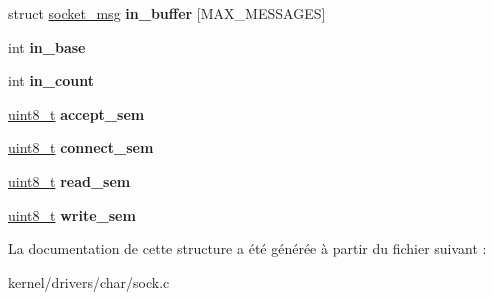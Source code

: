 \begin{DoxyCompactItemize}
\item 
\hypertarget{structsocket_a9ee09df65b7ec6bccd58fe2d4eebe6d9}{struct \hyperlink{structsocket__msg}{socket\-\_\-msg} {\bfseries in\-\_\-buffer} \mbox{[}M\-A\-X\-\_\-\-M\-E\-S\-S\-A\-G\-E\-S\mbox{]}}\label{structsocket_a9ee09df65b7ec6bccd58fe2d4eebe6d9}

\item 
\hypertarget{structsocket_ad1f8d42ded9f1e8a017780fa5bde11a0}{int {\bfseries in\-\_\-base}}\label{structsocket_ad1f8d42ded9f1e8a017780fa5bde11a0}

\item 
\hypertarget{structsocket_a3f3e2a3210219cad6bf97effcb29c074}{int {\bfseries in\-\_\-count}}\label{structsocket_a3f3e2a3210219cad6bf97effcb29c074}

\item 
\hypertarget{structsocket_ad7b80474cddbbbe5b8ca6a88c3790519}{\hyperlink{types_8h_aba7bc1797add20fe3efdf37ced1182c5}{uint8\-\_\-t} {\bfseries accept\-\_\-sem}}\label{structsocket_ad7b80474cddbbbe5b8ca6a88c3790519}

\item 
\hypertarget{structsocket_a2892cf67b33e9b8fc0cfd3094ad3d3fd}{\hyperlink{types_8h_aba7bc1797add20fe3efdf37ced1182c5}{uint8\-\_\-t} {\bfseries connect\-\_\-sem}}\label{structsocket_a2892cf67b33e9b8fc0cfd3094ad3d3fd}

\item 
\hypertarget{structsocket_acff0fb866f8282e667e1ee6ecc3ea355}{\hyperlink{types_8h_aba7bc1797add20fe3efdf37ced1182c5}{uint8\-\_\-t} {\bfseries read\-\_\-sem}}\label{structsocket_acff0fb866f8282e667e1ee6ecc3ea355}

\item 
\hypertarget{structsocket_a6dcd09bbe72cd9781a3d3bfff9dda45b}{\hyperlink{types_8h_aba7bc1797add20fe3efdf37ced1182c5}{uint8\-\_\-t} {\bfseries write\-\_\-sem}}\label{structsocket_a6dcd09bbe72cd9781a3d3bfff9dda45b}

\end{DoxyCompactItemize}


La documentation de cette structure a été générée à partir du fichier suivant \-:\begin{DoxyCompactItemize}
\item 
kernel/drivers/char/sock.\-c\end{DoxyCompactItemize}

